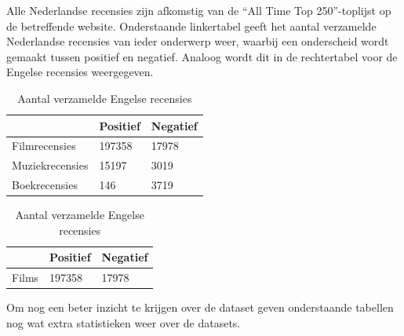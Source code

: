 Alle Nederlandse recensies zijn afkomstig van de ``All Time Top 250''-toplijst op de betreffende website. Onderstaande linkertabel geeft het aantal verzamelde Nederlandse recensies van ieder onderwerp weer, waarbij een onderscheid wordt gemaakt tussen positief en negatief. Analoog wordt dit in de rechtertabel voor de Engelse recensies weergegeven.\\

\begin{table}[h]
\centering
\setlength\tabcolsep{2pt}
\begin{minipage}[t]{0.48\textwidth}
\centering
\begin{tabular}{l|l|l|}
\cline{2-3}
                                      & Positief & Negatief \\ \hline
\multicolumn{1}{|l|}{Filmrecensies}   & 197358   & 17978    \\ \hline
\multicolumn{1}{|l|}{Muziekrecensies} & 15197    & 3019     \\ \hline
\multicolumn{1}{|l|}{Boekrecensies}   & 146      & 3719     \\ \hline
\end{tabular}
\caption{Aantal verzamelde Nederlandse recensies} 
\end{minipage}%
\hfill
\begin{minipage}[t]{0.48\textwidth}
\centering
\begin{tabular}{l|l|l|}
\cline{2-3}
                            & Positief & Negatief \\ \hline
\multicolumn{1}{|l|}{Films} & 197358   & 17978    \\ \hline
\end{tabular}
\caption{Aantal verzamelde Engelse recensies}
\end{minipage}
\end{table}


Om nog een beter inzicht te krijgen over de dataset geven onderstaande tabellen nog wat extra statistieken weer over de datasets.\\

